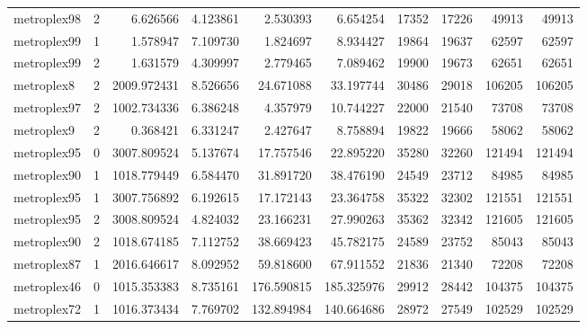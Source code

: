 \begin{longtable}{|l|r|r|r|r|r|r|r|r|r|}
metroplex98 & 2 & 6.626566 & 4.123861 & 2.530393 & 6.654254 & 17352 & 17226 & 49913 & 49913 \\
metroplex99 & 1 & 1.578947 & 7.109730 & 1.824697 & 8.934427 & 19864 & 19637 & 62597 & 62597 \\
metroplex99 & 2 & 1.631579 & 4.309997 & 2.779465 & 7.089462 & 19900 & 19673 & 62651 & 62651 \\
metroplex8 & 2 & 2009.972431 & 8.526656 & 24.671088 & 33.197744 & 30486 & 29018 & 106205 & 106205 \\
metroplex97 & 2 & 1002.734336 & 6.386248 & 4.357979 & 10.744227 & 22000 & 21540 & 73708 & 73708 \\
metroplex9 & 2 & 0.368421 & 6.331247 & 2.427647 & 8.758894 & 19822 & 19666 & 58062 & 58062 \\
metroplex95 & 0 & 3007.809524 & 5.137674 & 17.757546 & 22.895220 & 35280 & 32260 & 121494 & 121494 \\
metroplex90 & 1 & 1018.779449 & 6.584470 & 31.891720 & 38.476190 & 24549 & 23712 & 84985 & 84985 \\
metroplex95 & 1 & 3007.756892 & 6.192615 & 17.172143 & 23.364758 & 35322 & 32302 & 121551 & 121551 \\
metroplex95 & 2 & 3008.809524 & 4.824032 & 23.166231 & 27.990263 & 35362 & 32342 & 121605 & 121605 \\
metroplex90 & 2 & 1018.674185 & 7.112752 & 38.669423 & 45.782175 & 24589 & 23752 & 85043 & 85043 \\
metroplex87 & 1 & 2016.646617 & 8.092952 & 59.818600 & 67.911552 & 21836 & 21340 & 72208 & 72208 \\
metroplex46 & 0 & 1015.353383 & 8.735161 & 176.590815 & 185.325976 & 29912 & 28442 & 104375 & 104375 \\
metroplex72 & 1 & 1016.373434 & 7.769702 & 132.894984 & 140.664686 & 28972 & 27549 & 102529 & 102529 \\
\end{longtable}
